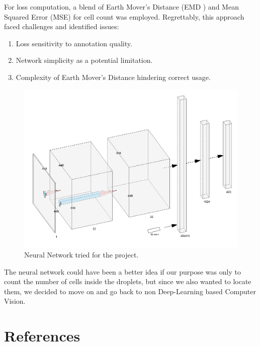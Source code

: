 \documentclass[12pt]{beamer}
\begin{document}
\begin{frame}[t]
\begin{multicols}{3}
\begin{multicols}{2}
For loss computation, a blend of Earth Mover's Distance (EMD \cite{emd}) and Mean Squared Error (MSE) for cell count was employed. Regrettably, this approach faced challenges and identified issues:
\begin{enumerate}
\item Loss sensitivity to annotation quality.
\item Network simplicity as a potential limitation.
\item Complexity of Earth Mover's Distance hindering correct usage.
\end{enumerate}
\vfill
\begin{center}
\begin{figure}
    \centering
    \includegraphics[width=\columnwidth]{figs/nn.png}   
    \caption{Neural Network tried for the project.}
    \label{fig:nn}
\end{figure}
\end{center}

The neural network could have been a better idea if our purpose was only to count the number of cells inside the droplets, but since we also wanted to locate them, we decided to move on and go back to non Deep-Learning based Computer Vision.
\end{multicols}


\section{References}
\printbibliography[heading=none]

\end{multicols}
\end{frame}
\end{document}
